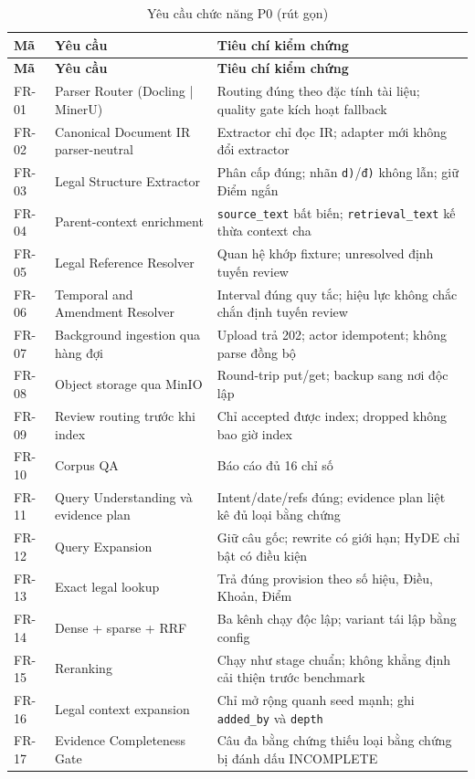 \documentclass[a4paper,12pt]{extreport}
\newcommand{\code}[1]{\texttt{#1}}
\begin{document}
\begin{longtable}{p{1.6cm}p{5.2cm}p{6.5cm}}
\caption{Yêu cầu chức năng P0 (rút gọn)}\\
\toprule
\textbf{Mã} & \textbf{Yêu cầu} & \textbf{Tiêu chí kiểm chứng}\\
\midrule
\endfirsthead
\toprule
\textbf{Mã} & \textbf{Yêu cầu} & \textbf{Tiêu chí kiểm chứng}\\
\midrule
\endhead
FR-01 & Parser Router (Docling | MinerU) & Routing đúng theo đặc tính tài liệu; quality gate kích hoạt fallback\\
FR-02 & Canonical Document IR parser-neutral & Extractor chỉ đọc IR; adapter mới không đổi extractor\\
FR-03 & Legal Structure Extractor & Phân cấp đúng; nhãn \code{d)}/\code{đ)} không lẫn; giữ Điểm ngắn\\
FR-04 & Parent-context enrichment & \code{source\_text} bất biến; \code{retrieval\_text} kế thừa context cha\\
FR-05 & Legal Reference Resolver & Quan hệ khớp fixture; unresolved định tuyến review\\
FR-06 & Temporal and Amendment Resolver & Interval đúng quy tắc; hiệu lực không chắc chắn định tuyến review\\
FR-07 & Background ingestion qua hàng đợi & Upload trả 202; actor idempotent; không parse đồng bộ\\
FR-08 & Object storage qua MinIO & Round-trip put/get; backup sang nơi độc lập\\
FR-09 & Review routing trước khi index & Chỉ accepted được index; dropped không bao giờ index\\
FR-10 & Corpus QA & Báo cáo đủ 16 chỉ số\\
FR-11 & Query Understanding và evidence plan & Intent/date/refs đúng; evidence plan liệt kê đủ loại bằng chứng\\
FR-12 & Query Expansion & Giữ câu gốc; rewrite có giới hạn; HyDE chỉ bật có điều kiện\\
FR-13 & Exact legal lookup & Trả đúng provision theo số hiệu, Điều, Khoản, Điểm\\
FR-14 & Dense + sparse + RRF & Ba kênh chạy độc lập; variant tái lập bằng config\\
FR-15 & Reranking & Chạy như stage chuẩn; không khẳng định cải thiện trước benchmark\\
FR-16 & Legal context expansion & Chỉ mở rộng quanh seed mạnh; ghi \code{added\_by} và \code{depth}\\
FR-17 & Evidence Completeness Gate & Câu đa bằng chứng thiếu loại bằng chứng bị đánh dấu INCOMPLETE\\

\end{longtable}
\end{document}
